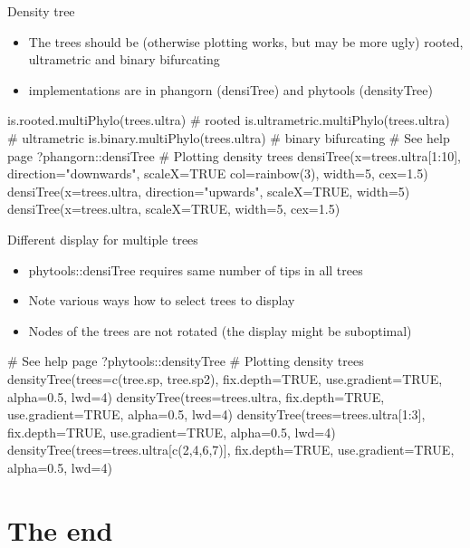 \documentclass[compress, ucs, xelatex, 11pt, xcolor=x11names, aspectratio=169,
	hyperref={
		bookmarks=true,
		unicode=true,
		colorlinks=true,
		pdftitle={HybSeq course},
		plainpages=false,
		pdfauthor={Vojtech Zeisek},
		pdfsubject={Practical processing of HybSeq target enrichment sequencing data on computing grids like MetaCentrum},
		pdfcreator={XeLaTeX},
		pdfkeywords={BASH, command line, GNU, HybSeq, Linux, MetaCentrum, sequencing shell, target enrichment},
		linkcolor=Cyan2, %
		anchorcolor=Firebrick2, %
		citecolor=Firebrick2, %
		filecolor=Firebrick2, %
		menucolor=Firebrick2, %
		urlcolor=Chartreuse2, %
		pdftex},
	url={hyphens, lowtilde} %
	]{beamer}
\renewcommand{\texttt}[1]{\colorbox{Snow4}{{\ttfamily #1}}}
\begin{document}
\begin{frame}[fragile]{Density tree}
	\begin{itemize}
		\item The trees should be (otherwise plotting works, but may be more ugly) rooted, ultrametric and binary bifurcating
		\item implementations are in \texttt{phangorn} (\texttt{densiTree}) and \texttt{phytools} (\texttt{densityTree})
	\end{itemize}
	\begin{spluscode}
    is.rooted.multiPhylo(trees.ultra) # rooted
    is.ultrametric.multiPhylo(trees.ultra) # ultrametric
    is.binary.multiPhylo(trees.ultra) # binary bifurcating
    # See help page
    ?phangorn::densiTree
    # Plotting density trees
    densiTree(x=trees.ultra[1:10], direction="downwards", scaleX=TRUE
      col=rainbow(3), width=5, cex=1.5)
    densiTree(x=trees.ultra, direction="upwards", scaleX=TRUE, width=5)
    densiTree(x=trees.ultra, scaleX=TRUE, width=5, cex=1.5)
	\end{spluscode}
\end{frame}

\begin{frame}[fragile]{Different display for multiple trees}
	\begin{itemize}
		\item \texttt{phytools::densiTree} requires same number of tips in all trees
		\item Note various ways how to select trees to display
		\item Nodes of the trees are not rotated (the display might be suboptimal)
	\end{itemize}
	\begin{spluscode}
    # See help page
    ?phytools::densityTree
    # Plotting density trees
    densityTree(trees=c(tree.sp, tree.sp2), fix.depth=TRUE, use.gradient=TRUE,
      alpha=0.5, lwd=4)
    densityTree(trees=trees.ultra, fix.depth=TRUE, use.gradient=TRUE,
      alpha=0.5, lwd=4)
    densityTree(trees=trees.ultra[1:3], fix.depth=TRUE, use.gradient=TRUE,
      alpha=0.5, lwd=4)
    densityTree(trees=trees.ultra[c(2,4,6,7)], fix.depth=TRUE,
      use.gradient=TRUE, alpha=0.5, lwd=4)
	\end{spluscode}
\end{frame}

\section{The end}
\end{document}
